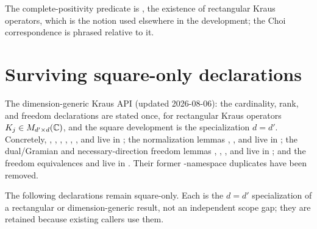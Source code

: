 \documentclass{article}
\begin{document}
The complete-positivity predicate is , the existence of
rectangular Kraus operators, which is the notion used elsewhere in the
development; the Choi correspondence is phrased relative to it.

\section{Surviving square-only declarations}

The dimension-generic Kraus API (updated 2026-08-06): the cardinality,
rank, and freedom declarations are stated once, for rectangular Kraus
operators $K_j\in M_{d'\times d}(\mathbb{C})$, and the square development is the
specialization $d=d'$.  Concretely, ,
, ,
,
,
, and
 live in
; the normalization lemmas
,
, and
 live in
; the dual/Gramian and
necessary-direction freedom lemmas ,
,
, and 
live in ; and the freedom
equivalences  and
 live in
.  Their former
-namespace duplicates have been removed.

The following declarations remain square-only.  Each is the $d=d'$
specialization of a rectangular or dimension-generic result, not an
independent scope gap; they are retained because existing callers use
them.
\end{document}
